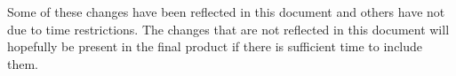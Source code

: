 \documentclass[
10pt, %
a4paper, %
oneside, %
headinclude,footinclude, %
BCOR5mm, %
]{scrartcl}
\begin{document}
Some of these changes have been reflected in this document and others have not due to time restrictions. The changes that are not reflected in this document will hopefully be present in the final product if there is sufficient time to include them.



\newpage



% 



\end{document}
